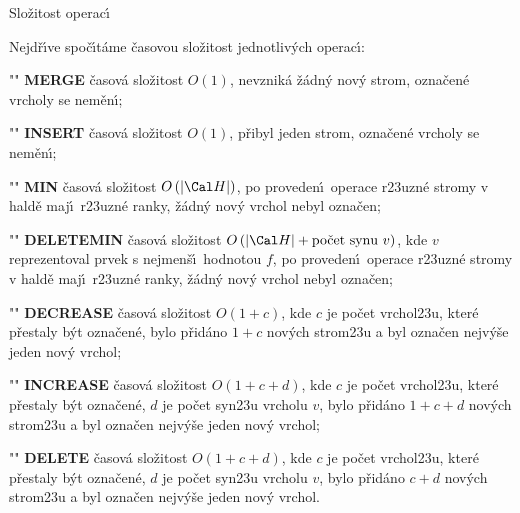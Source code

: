 \subhead
Slo\v zitost operac\'\i
\endsubhead
\smallskip

\flushpar Nejd\v r\'\i ve spo\v c\'\i t\'ame \v casovou slo\v zitost 
jednotliv\'ych operac\'\i :
\roster
\item"{}"
{\bf MERGE }\v casov\'a slo\v zitost $O\left(1\right)$, nevznik\'a \v z\'adn\'y nov\'y strom, ozna\-\v ce\-n\'e vrcholy se nem\v en\'\i;
\item"{}" 
{\bf INSERT }\v casov\'a slo\v zitost $O\left(1\right)$, p\v ribyl jeden strom, 
ozna\v cen\'e vrcholy se nem\v en\'\i;
\item"{}"
{\bf MIN }\v casov\'a slo\v zitost $O\left(|\Cal H|\right)$, po proveden\'\i\ operace 
r\accent23uzn\'e stro\-my v hald\v e maj\'\i\ r\accent23uzn\'e 
ranky, \v z\'adn\'y nov\'y vrchol nebyl ozna\v cen;  
\item"{}"
{\bf DELETEMIN }\v casov\'a slo\v zitost $O\left(|\Cal H|+\text{\rm po\v cet syn\accent23u }v\right)$, kde $v$ reprezentoval prvek s nejmen\v s\'\i\ hodnotou $f$, po proveden\'\i\ ope\-ra\-ce r\accent23uzn\'e stromy v hald\v e maj\'\i\ 
r\accent23uzn\'e ranky, \v z\'adn\'y nov\'y vrchol nebyl ozna\v cen; 
\item"{}"
{\bf DECREASE }\v casov\'a slo\v zitost $O\left(1+c\right)$, kde $c$ je po\v cet 
vrchol\accent23u, kter\'e p\v restaly b\'yt ozna\v cen\'e, 
bylo p\v rid\'ano $1+c$ nov\'ych strom\accent23u a byl ozna\v cen 
nejv\'y\v se jeden nov\'y vrchol;
\item"{}"
{\bf INCREASE }\v casov\'a slo\v zitost $O\left(1+c+d\right)$, kde $c$ je po\v cet 
vrchol\accent23u, kter\'e p\v restaly b\'yt ozna\v cen\'e, $d$ je 
po\v cet syn\accent23u vrcholu $v$, bylo p\v rid\'ano $1+c+d$ 
nov\'ych strom\accent23u a byl ozna\v cen nejv\'y\v se jeden 
nov\'y vrchol;
\item"{}"
{\bf DELETE }\v casov\'a slo\v zitost $O\left(1+c+d\right)$, kde $c$ je po\v cet 
vrchol\accent23u, kter\'e p\v restaly b\'yt ozna\v cen\'e, $d$ je 
po\v cet syn\accent23u vrcholu $v$, bylo p\v rid\'ano $c+d$ 
nov\'ych strom\accent23u a byl ozna\v cen nejv\'y\v se jeden 
nov\'y vrchol.
\endroster

